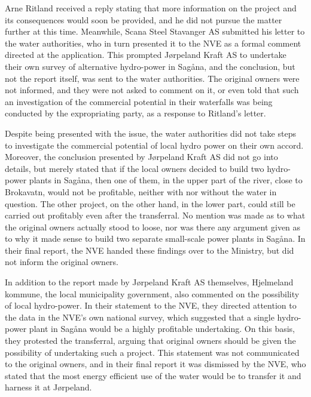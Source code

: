 Arne Ritland received a reply stating that more information on the project and its consequences would soon be provided, and he did not pursue the matter further at this time. Meanwhile, Scana Steel Stavanger AS submitted his letter to the water authorities, who in turn presented it to the NVE as a formal comment directed at the application. This prompted Jørpeland Kraft AS to undertake their own survey of alternative hydro-power in Sagåna, and the conclusion, but not the report itself, was sent to the water authorities. The original owners were not informed, and they were not asked to comment on it, or even told that such an investigation of the commercial potential in their waterfalls was being conducted by the expropriating party, as a response to Ritland's letter.

Despite being presented with the issue, the water authorities did not take steps to investigate the commercial potential of local hydro power on their own accord. Moreover, the conclusion presented by Jørpeland Kraft AS did not go into details, but merely stated that if the local owners decided to build two hydro-power plants in Sagåna, then one of them, in the upper part of the river, close to Brokavatn, would not be profitable, neither with nor without the water in question. The other project, on the other hand, in the lower part, could still be carried out profitably even after the transferral. No mention was made as to what the original owners actually stood to loose, nor was there any argument given as to why it made sense to build two separate small-scale power plants in Sagåna. In their final report, the NVE handed these findings over to the Ministry, but did not inform the original owners. 

In addition to the report made by Jørpeland Kraft AS themselves, Hjelmeland kommune, the local municipality government, also commented on the possibility of local hydro-power. In their statement to the NVE, they directed attention to the data in the NVE's own national survey, which suggested that a single hydro-power plant in Sagåna would be a highly profitable undertaking. On this basis, they protested the transferral, arguing that original owners should be given the possibility of undertaking such a project. This statement was not communicated to the original owners, and in their final report it was dismissed by the NVE, who stated that the most energy efficient use of the water would be to transfer it and harness it at Jørpeland.

